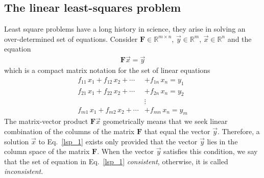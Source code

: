 \documentclass[12pt,a4paper,oneside]{book}
\begin{document}
\begin{onehalfspace}
\section{The linear least-squares problem}
Least square problems have a long history in science, they arise in solving an 
over-determined set of equations. Consider $\mathbf{F}\in\mathbb{R}^{m\times 
n}$, $\vec{y}\in\mathbb{R}^{m}$, $\vec{x}\in\mathbb{R}^{n}$ and the equation
\begin{equation}\label{lsp_1}
	\begin{aligned}
		\mathbf{F}\vec{x}=\vec{y}
	\end{aligned}
\end{equation} 
which is a compact matrix notation for the set of linear equations
\begin{equation*}
	\begin{aligned}
		f_{11}\,x_1+f_{12}\,x_2+\cdots&+f_{1n}\,x_n = y_1 \\[6pt]
		f_{21}\,x_1+f_{22}\,x_2+\cdots&+f_{2n}\,x_n = y_2 \\[6pt]
		&\vdots \\[6pt]
		f_{m1}\,x_1+f_{m2}\,x_2+\cdots&+f_{mn}\,x_n = y_m
	\end{aligned}
\end{equation*} 
The matrix-vector product $\mathbf{F}\vec{x}$ geometrically means that we seek 
linear combination of the columns of the matrix $\mathbf{F}$ that equal the 
vector $\vec{y}$. Therefore, a solution $\vec{x}$ to Eq.~\eqref{lsp_1} exists 
only provided that the vector $\vec{y}$ lies in the column space of the matrix 
$\mathbf{F}$. When the vector $\vec{y}$ satisfies this condition, we say that 
the set of equation in Eq.~\eqref{lsp_1} \textit{consistent}, otherwise, it is 
called \textit{inconsistent}.


\end{onehalfspace}
\end{document}
